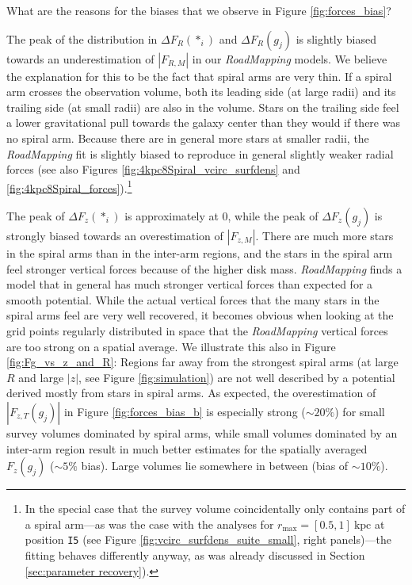 \documentclass[iop,revtex4,numberedappendix,appendixfloats]{emulateapj}
\newcommand{\RM}{{\sl RoadMapping}}
\begin{document}
What are the reasons for the biases that we observe in Figure \ref{fig:forces_bias}? 

The peak of the distribution in $\Delta F_R(*_i)$ and $\Delta F_R(g_j)$ is slightly biased towards an underestimation of $|F_{R,M}|$ in our \RM{} models. We believe the explanation for this to be the fact that spiral arms are very thin. If a spiral arm crosses the observation volume, both its leading side (at large radii) and its trailing side (at small radii) are also in the volume. Stars on the trailing side feel a lower gravitational pull towards the galaxy center than they would if there was no spiral arm. Because there are in general more stars at smaller radii, the \RM{} fit is slightly biased to reproduce in general slightly weaker radial forces (see also Figures \ref{fig:4kpc8Spiral_vcirc_surfdens} and \ref{fig:4kpc8Spiral_forces}).\footnote{In the special case that the survey volume coincidentally only contains part of a spiral arm---as was the case with the analyses for $r_\text{max}=[0.5,1]~\text{kpc}$ at position \texttt{I5} (see Figure \ref{fig:vcirc_surfdens_suite_small}, right panels)---the fitting behaves differently anyway, as was already discussed in Section \ref{sec:parameter recovery}).}

The peak of $\Delta F_z(*_i)$ is approximately at 0, while the peak of $\Delta F_z(g_j)$ is strongly biased towards an overestimation of $|F_{z,M}|$. There are much more stars in the spiral arms than in the inter-arm regions, and the stars in the spiral arm feel stronger vertical forces because of the higher disk mass. \RM{} finds a model that in general has much stronger vertical forces than expected for a smooth potential. While the actual vertical forces that the many stars in the spiral arms feel are very well recovered, it becomes obvious when looking at the grid points regularly distributed in space that the \RM{} vertical forces are too strong on a spatial average. We illustrate this also in Figure \ref{fig:Fg_vs_z_and_R}: Regions far away from the strongest spiral arms (at large $R$ and large $|z|$, see Figure \ref{fig:simulation}) are not well described by a potential derived mostly from stars in spiral arms. As expected, the overestimation of $|F_{z,T}(g_j)|$ in Figure \ref{fig:forces_bias_b} is especially strong ($\sim 20 \%$) for small survey volumes dominated by spiral arms, while small volumes dominated by an inter-arm region result in much better estimates for the spatially averaged $F_z(g_j)$ ($\sim5\%$ bias). Large volumes lie somewhere in between (bias of $\sim10\%$).
\end{document}
